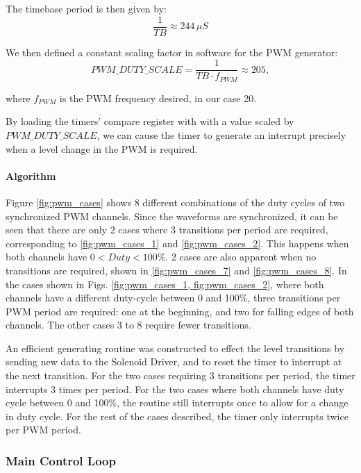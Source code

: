 The timebase period is then given by:
\begin{equation}
\frac{1}{TB}\approx244\,\mu{S}
\end{equation}

We then defined a constant scaling factor in software for the PWM generator:
\begin{equation}
{PWM\_DUTY\_SCALE}=\frac{1}{TB\cdot{f_{PWM}}}\approx205,
\end{equation}

where $f_{PWM}$ is the PWM frequency desired, in our case \unit{20}{\hertz}.

By loading the timers' compare register with with a value scaled by ${PWM\_DUTY\_SCALE}$, we can cause the timer to generate an interrupt precisely when a level change in the PWM is required.

\paragraph{Algorithm}

Figure \ref{fig:pwm_cases} shows 8 different combinations of the duty cycles of two synchronized PWM channels. Since the waveforms are synchronized, it can be seen that there are only 2 cases where 3 transitions per period are required, corresponding to \ref{fig:pwm_cases_1} and \ref{fig:pwm_cases_2}. This happens when both channels have $0<Duty<100\%$. 2 cases are also apparent when no transitions are required, shown in \ref{fig:pwm_cases_7} and \ref{fig:pwm_cases_8}. In the cases shown in Figs. \ref{fig:pwm_cases_1, fig:pwm_cases_2}, where both channels have a different duty-cycle between 0 and 100\%, three transitions per PWM period are required: one at the beginning, and two for falling edges of both channels. The other cases 3 to 8 require fewer transitions.

An efficient generating routine was constructed to effect the level transitions by sending new data to the Solenoid Driver, and to reset the timer to interrupt at the next transition. For the two cases requiring 3 transitions per period, the timer interrupts 3 times per period. For the two cases where both channels have duty cycle between 0 and 100\%, the routine still interrupts once to allow for a change in duty cycle. For the rest of the cases described, the timer only interrupts twice per PWM period.



\subsubsection{Main Control Loop}